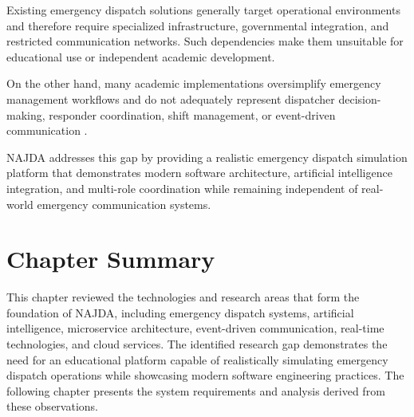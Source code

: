 Existing emergency dispatch solutions generally target operational environments and therefore require specialized infrastructure, governmental integration, and restricted communication networks. Such dependencies make them unsuitable for educational use or independent academic development.

On the other hand, many academic implementations oversimplify emergency management workflows and do not adequately represent dispatcher decision-making, responder coordination, shift management, or event-driven communication \cite{newman2021microservices,richardson2018microservices}.

NAJDA addresses this gap by providing a realistic emergency dispatch simulation platform that demonstrates modern software architecture, artificial intelligence integration, and multi-role coordination while remaining independent of real-world emergency communication systems.

\section{Chapter Summary}

This chapter reviewed the technologies and research areas that form the foundation of NAJDA, including emergency dispatch systems, artificial intelligence, microservice architecture, event-driven communication, real-time technologies, and cloud services. The identified research gap demonstrates the need for an educational platform capable of realistically simulating emergency dispatch operations while showcasing modern software engineering practices. The following chapter presents the system requirements and analysis derived from these observations.